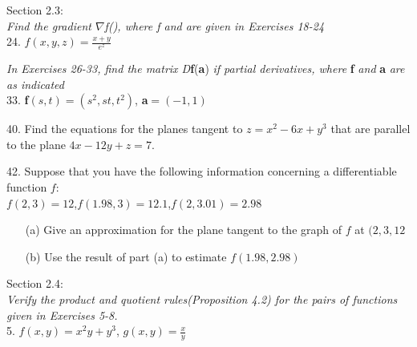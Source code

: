 \documentclass[12pt,letterpaper]{hmcpset}
\begin{document}

\begin{problem}
Section 2.3: 
\\\textit{Find the gradient $\nabla$f(\textbf{}), where f and \textbf{} are given in Exercises 18-24}
\\
24. $f(x,y,z)=\frac{x+y}{e^z}$
\end{problem}

\newpage

\begin{problem}
\textit{In Exercises 26-33, find the matrix D}\textbf{f}(\textbf{a})\textit{ if partial derivatives, where }\textbf{f}\textit{ and} \textbf{a} \textit{ are as indicated}
\\
33. \textbf{f}$(s, t)=(s^2, st, t^2)$, \textbf{a}$=(-1,1)$
\end{problem}

\newpage


\begin{problem}
40. Find the equations for the planes tangent to $z=x^2-6x+y^3$ that are parallel to the plane $4x-12y+z=7$.
\end{problem}

\newpage


\begin{problem}
42. Suppose that you have the following information concerning a differentiable function $f$:\\
$f(2,3)=12$,$f(1.98,3)=12.1$,$f(2,3.01)=2.98$
\begin{enumerate}
    \item[(a)] Give an approximation for the plane tangent to the graph of $f$ at $(2,3,12$
    \item[(b)] Use the result of part (a) to estimate $f(1.98, 2.98)$
\end{enumerate}

\end{problem}

\newpage


\begin{problem}
Section 2.4:
\\
\textit{Verify the product and quotient rules(Proposition 4.2) for the pairs of functions given in Exercises 5-8.}
\\
5. $f(x,y)=x^2y+y^3$, $g(x,y)=\frac{x}{y}$
\end{problem}
\end{document}
